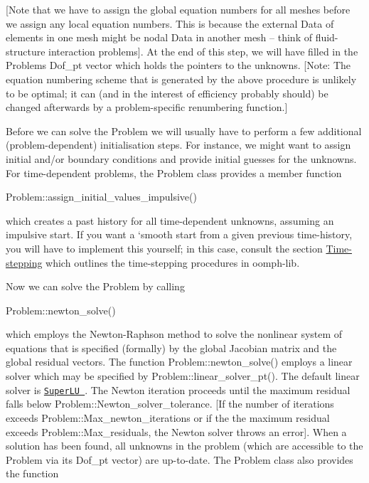 \begin{DoxyEnumerate}
\begin{DoxyEnumerate}
\end{DoxyEnumerate}\mbox{[}Note that we have to assign the global equation numbers for all meshes before we assign any local equation numbers. This is because the external {\ttfamily Data} of elements in one mesh might be nodal {\ttfamily Data} in another mesh -- think of fluid-\/structure interaction problems\mbox{]}. At the end of this step, we will have filled in the {\ttfamily Problem\textquotesingle{}s} {\ttfamily Dof\+\_\+pt} vector which holds the pointers to the unknowns. \mbox{[}Note\+: The equation numbering scheme that is generated by the above procedure is unlikely to be optimal; it can (and in the interest of efficiency probably should) be changed afterwards by a problem-\/specific renumbering function.\mbox{]}
\item Before we can solve the {\ttfamily Problem} we will usually have to perform a few additional (problem-\/dependent) initialisation steps. For instance, we might want to assign initial and/or boundary conditions and provide initial guesses for the unknowns. For time-\/dependent problems, the {\ttfamily Problem} class provides a member function 
\begin{DoxyCode}
Problem::assign\_initial\_values\_impulsive() 
\end{DoxyCode}
 which creates a past history for all time-\/dependent unknowns, assuming an impulsive start. If you want a `smooth\textquotesingle{} start from a given previous time-\/history, you will have to implement this yourself; in this case, consult the section \hyperlink{index_timestepping}{Time-\/stepping} which outlines the time-\/stepping procedures in {\ttfamily oomph-\/lib}.
\item Now we can solve the {\ttfamily Problem} by calling 
\begin{DoxyCode}
Problem::newton\_solve() 
\end{DoxyCode}
 which employs the Newton-\/\+Raphson method to solve the nonlinear system of equations that is specified (formally) by the global Jacobian matrix and the global residual vectors. The function {\ttfamily Problem\+::newton\+\_\+solve()} employs a linear solver which may be specified by {\ttfamily Problem\+::linear\+\_\+solver\+\_\+pt()}. The default linear solver is \href{http://crd.lbl.gov/~xiaoye/SuperLU/}{\tt Super\+LU }. The Newton iteration proceeds until the maximum residual falls below {\ttfamily Problem\+::\+Newton\+\_\+solver\+\_\+tolerance}. \mbox{[}If the number of iterations exceeds {\ttfamily Problem\+::\+Max\+\_\+newton\+\_\+iterations} or if the the maximum residual exceeds {\ttfamily Problem\+::\+Max\+\_\+residuals}, the Newton solver throws an error\mbox{]}. When a solution has been found, all unknowns in the problem (which are accessible to the {\ttfamily Problem} via its {\ttfamily Dof\+\_\+pt} vector) are up-\/to-\/date. The {\ttfamily Problem} class also provides the function 

\end{DoxyEnumerate}

